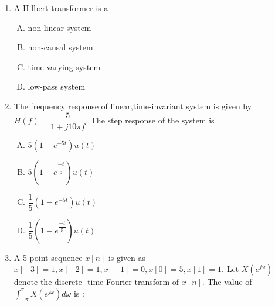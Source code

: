 \documentclass[journal,12pt,twocolumn]{IEEEtran}
\begin{document}
\begin{enumerate}
\begin{enumerate}[(A)]
\end{enumerate}


\item A Hilbert transformer is a\\

\begin{enumerate}[(A)]
\setlength\itemsep{2em}

\item non-linear system
\item non-causal system
\item time-varying system
\item low-pass system

\end{enumerate}

\item The frequency response of linear,time-invariant system is given by $H(f)=\dfrac{5}{1+j10\pi f}$. The step response of the system is\\
\begin{enumerate}[(A)]

\setlength\itemsep{2em}

\item $5(1-e^{-5t})u(t)$
\item $5(1-e^{\dfrac{-t}{5}})u(t)$
\item $\dfrac{1}{5}(1-e^{-5t})u(t)$
\item $\dfrac{1}{5}(1-e^{\dfrac{-t}{5}})u(t)$

\end{enumerate}

\item A 5-point sequence $x[n]$ is given as \newline $x[-3]=1,x[-2]=1,x[-1]=0,x[0]=5,x[1]=1.$  Let $X(e^{j\omega})$ denote the discrete -time Fourier transform of $x[n]$. The value of $\int_{-\pi}^{\pi}X(e^{j\omega})d\omega
$ is :\\
\begin{enumerate}[(A)]
\begin{multicols}{4}
\setlength\itemsep{2em}


\end{multicols}
\end{enumerate}
\end{enumerate}
\end{document}
